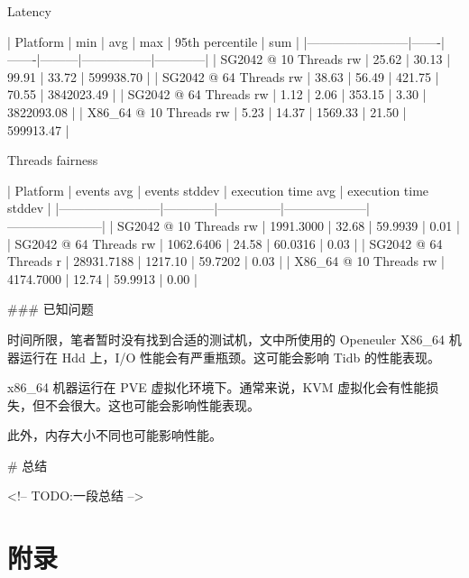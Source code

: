 \documentclass{article}
\begin{document}
\begin{markdown}
Latency

| Platform               | min   | avg   | max     | 95th percentile | sum        |
|------------------------|-------|-------|---------|-----------------|------------|
| SG2042 @ 10 Threads rw | 25.62 | 30.13 | 99.91   | 33.72           | 599938.70  |
| SG2042 @ 64 Threads rw | 38.63 | 56.49 | 421.75  | 70.55           | 3842023.49 |
| SG2042 @ 64 Threads rw | 1.12  | 2.06  | 353.15  | 3.30            | 3822093.08 |
| X86_64 @ 10 Threads rw | 5.23  | 14.37 | 1569.33 | 21.50           | 599913.47  |


Threads fairness

| Platform               | events avg | events stddev | execution time avg | execution time stddev |
|------------------------|------------|---------------|--------------------|-----------------------|
| SG2042 @ 10 Threads rw | 1991.3000  | 32.68         | 59.9939            | 0.01                  |
| SG2042 @ 64 Threads rw | 1062.6406  | 24.58         | 60.0316            | 0.03                  |
| SG2042 @ 64 Threads r  | 28931.7188 | 1217.10       | 59.7202            | 0.03                  |
| X86_64 @ 10 Threads rw | 4174.7000  | 12.74         | 59.9913            | 0.00                  |

### 已知问题

时间所限，笔者暂时没有找到合适的测试机，文中所使用的 Openeuler X86_64 机器运行在 Hdd 上，I/O 性能会有严重瓶颈。这可能会影响 Tidb 的性能表现。

x86_64 机器运行在 PVE 虚拟化环境下。通常来说，KVM 虚拟化会有性能损失，但不会很大。这也可能会影响性能表现。

此外，内存大小不同也可能影响性能。

# 总结

<!-- TODO:一段总结 -->


\end{markdown}

\newpage
\appendix

\section{附录}

\end{document}

